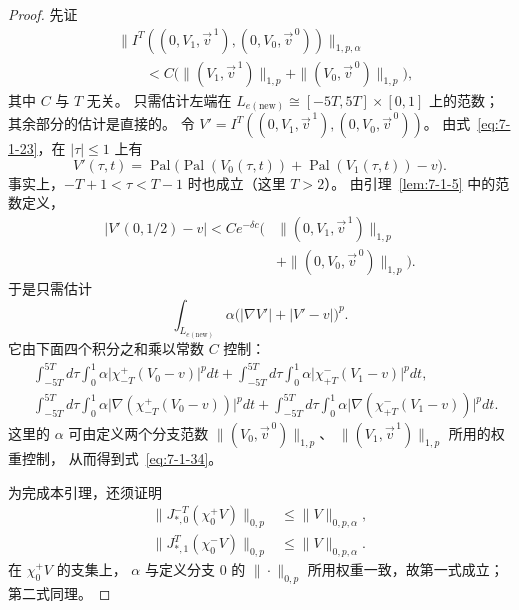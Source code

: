 \begin{proof}
先证
\begin{equation}
\begin{aligned}
&\bigl\|I^T((0,V_1,\vec v^{\,1}),
                 (0,V_0,\vec v^{\,0}))\bigr\|_{1,p,\alpha}\\
&\qquad<C\bigl(
\|(V_1,\vec v^{\,1})\|_{1,p}
+\|(V_0,\vec v^{\,0})\|_{1,p}\bigr),
\end{aligned}
\tag{7.1.34}\label{eq:7-1-34}
\end{equation}
其中 $C$ 与 $T$ 无关。
只需估计左端在
$L_{e(\mathrm{new})}\cong[-5T,5T]\times[0,1]$
上的范数；其余部分的估计是直接的。
令
$V'=I^T((0,V_1,\vec v^{\,1}),
         (0,V_0,\vec v^{\,0}))$。
由式~\eqref{eq:7-1-23}，在 $|\tau|\leq1$ 上有
\[
V'(\tau,t)=\operatorname{Pal}\bigl(
\operatorname{Pal}(V_0(\tau,t))
+\operatorname{Pal}(V_1(\tau,t))-v\bigr).
\]
事实上，$-T+1<\tau<T-1$ 时也成立（这里 $T>2$）。
由引理~\ref{lem:7-1-5} 中的范数定义，
\[
\begin{aligned}
|V'(0,1/2)-v|<Ce^{-\delta c}
\bigl(&\|(0,V_1,\vec v^{\,1})\|_{1,p}\\
&+\|(0,V_0,\vec v^{\,0})\|_{1,p}\bigr).
\end{aligned}
\]
于是只需估计
\begin{equation}
\int_{L_{e(\mathrm{new})}}
\alpha\bigl(|\nabla V'|+|V'-v|\bigr)^p.
\tag{7.1.35}\label{eq:7-1-35}
\end{equation}
它由下面四个积分之和乘以常数 $C$ 控制：
\[
\begin{aligned}
&\int_{-5T}^{5T}\!d\tau\int_0^1
\alpha\bigl|\chi_{-T}^+(V_0-v)\bigr|^pdt
+\int_{-5T}^{5T}\!d\tau\int_0^1
\alpha\bigl|\chi_{+T}^-(V_1-v)\bigr|^pdt,\\
&\int_{-5T}^{5T}\!d\tau\int_0^1
\alpha\bigl|\nabla(\chi_{-T}^+(V_0-v))\bigr|^pdt
+\int_{-5T}^{5T}\!d\tau\int_0^1
\alpha\bigl|\nabla(\chi_{+T}^-(V_1-v))\bigr|^pdt.
\end{aligned}
\]
这里的 $\alpha$ 可由定义两个分支范数
$\|(V_0,\vec v^{\,0})\|_{1,p}$、
$\|(V_1,\vec v^{\,1})\|_{1,p}$ 所用的权重控制，
从而得到式~\eqref{eq:7-1-34}。

为完成本引理，还须证明
\begin{align}
\bigl\|J_{*,0}^{-T}(\chi_0^+V)\bigr\|_{0,p}
&\leq\|V\|_{0,p,\alpha},
\tag{7.1.36.1}\label{eq:7-1-36-1}\\
\bigl\|J_{*,1}^{T}(\chi_0^-V)\bigr\|_{0,p}
&\leq\|V\|_{0,p,\alpha}.
\tag{7.1.36.2}\label{eq:7-1-36-2}
\end{align}
在 $\chi_0^+V$ 的支集上，
$\alpha$ 与定义分支 $0$ 的 $\|\cdot\|_{0,p}$
所用权重一致，故第一式成立；第二式同理。
\end{proof}

